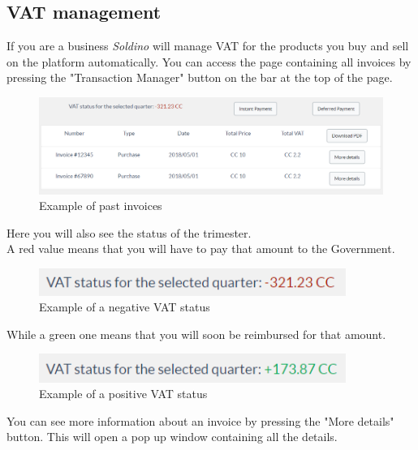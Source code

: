 	\subsection{VAT management}
	If you are a business \textit{Soldino} will manage VAT for the products 
	you buy and sell on the platform automatically. You can access the page 
	containing all invoices by pressing the "Transaction Manager" button 
	on the bar at the top of the page.
	\begin{figure}[H]
		\includegraphics[width=15cm]{res/images/past_invoices.png}
		\centering
		\caption{Example of past invoices}
	\end{figure}
	\noindent Here you will also see the status of the trimester. 
	\\A red value means that you will have to pay that amount to the 
	Government.
	\begin{figure}[H]
		\includegraphics[width=10cm]{res/images/negative_vat_status.png}
		\centering
		\caption{Example of a negative VAT status}
	\end{figure}
	\noindent While a green one means that you will soon be reimbursed for 
	that amount.
	\begin{figure}[H]
		\includegraphics[width=10cm]{res/images/positive_vat_status.png}
		\centering
		\caption{Example of a positive VAT status}
	\end{figure}
	\noindent You can see more information about an invoice by pressing the 
	"More details" button. This will open a pop up window containing all the 
	details.

